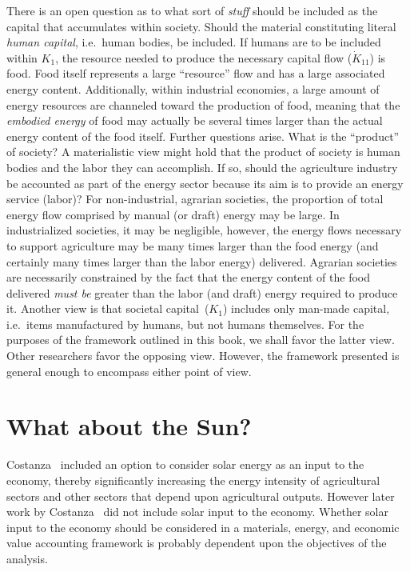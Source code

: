 There is an open
question as to what sort of \emph{stuff} 
should be included as the capital
that accumulates within society. 
Should the material constituting literal
\emph{human capital}, 
i.e.~human bodies, 
be included. 
If humans are to be included within $K_{1}$, 
the resource needed to produce the necessary capital
flow ($\dot{K}_{11}$) is food. 
Food itself represents a large ``resource''
flow and has a large associated energy content. 
Additionally, 
within industrial economies, 
a large amount of energy resources 
are channeled toward the production of food, 
meaning that the \emph{embodied energy}
of food may actually be several times larger than
the actual energy content of the food itself. 
Further questions arise. 
What is the ``product'' of society? 
A materialistic view might hold that the product of
society is human bodies and the labor they can accomplish. 
If so, 
should the agriculture industry 
be accounted as part of the energy sector 
because its aim is to provide 
an energy service (labor)? 
For non-industrial, agrarian societies, 
the proportion of total energy flow 
comprised by manual (or draft) energy 
may be large. 
In industrialized societies, 
it may be negligible, 
however, 
the energy flows necessary to support agriculture
may be many times larger than the food energy
(and certainly many times larger 
than the labor energy) 
delivered. 
Agrarian societies are necessarily constrained 
by the fact that the energy content of the food delivered 
\emph{must be} greater than the labor (and draft) 
energy required to produce it.
Another view is that societal capital~($K_{1}$) 
includes only man-made capital, 
i.e.\ items manufactured by humans,
but not humans themselves. 
For the purposes of the framework outlined in this book, 
we shall favor the latter view.
Other researchers favor the opposing view.\cite{Giampietro2013}
However,
the framework presented is general enough to encompass either point of view.


\section{What about the Sun?}
\label{sec:emergy}

Costanza~\cite{Costanza:1978vd} included an option to consider 
solar energy as an input to the economy, 
thereby significantly increasing the energy intensity 
of agricultural sectors and other sectors 
that depend upon agricultural outputs. 
However later work by Costanza~\cite{Costanza:1984tq,Costanza:1980ww} 
did not include solar input to the economy.
Whether solar input to the economy 
should be considered in a materials, energy, and economic value 
accounting framework is probably dependent upon 
the objectives of the analysis. 

